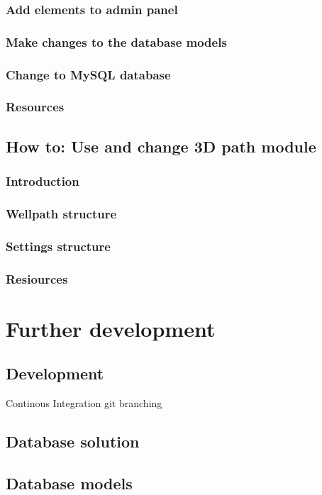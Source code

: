 \documentclass{report}
\begin{document}
\subsection{Add elements to admin panel}
\subsection{Make changes to the database models}
\subsection{Change to MySQL database} \label{sec:change_database}
\subsection{Resources}

\section{How to: Use and change 3D path module} \label{sec:use_and_change_frontend}
\subsection{Introduction}
\subsection{Wellpath structure}
\subsection{Settings structure}
\subsection{Resiources}

\chapter{Further development}
\section{Development} \label{sec:development}
Continous Integration git branching
\section{Database solution}
\section{Database models}
\end{document}

